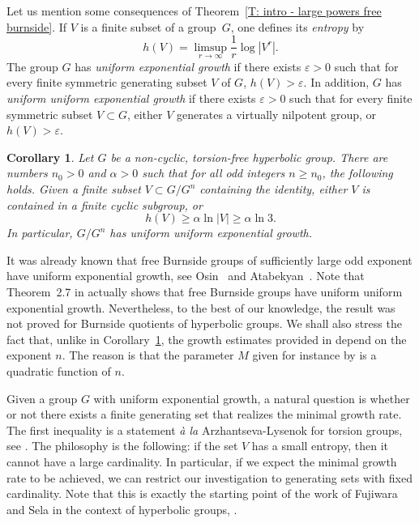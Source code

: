 \documentclass[11pt]{article}
\theoremstyle{plain}
\newtheorem{cor}[thm]{Corollary}
\theoremstyle{definition}
\begin{document}
Let us mention some consequences of Theorem~\ref{T: intro - large powers free burnside}.
If $V$ is a finite subset of a group~$G$, one defines its \emph{entropy} by
\begin{equation*}
h(V)= \limsup_{r \to \infty} \frac{1}{r}\log |V^r|.
\end{equation*}
The group $G$ has \emph{uniform exponential growth} if there exists $\varepsilon > 0$ such that for every finite symmetric generating subset $V$ of $G$, $h(V) > \varepsilon$.
In addition, $G$ has \emph{uniform uniform exponential growth} if there exists $\varepsilon > 0$ such that for every finite symmetric subset $V \subset G$, either $V$ generates a virtually nilpotent group, or $h(V) > \varepsilon$.

\begin{cor}
\label{C: intro - large powers free burnside}
Let $G$ be a non-cyclic, torsion-free hyperbolic group.
There are numbers $n_0>0$ and $\alpha>0$ such that for all odd integers $n \geqslant n_0$, the following holds.
Given a finite subset $V \subset G/G^n$ containing the identity, either $V$ is contained in a finite cyclic subgroup, or
\[
h(V) \geq \alpha \ln |V| \geq \alpha \ln 3.
\]
In particular, $G/G^n$ has uniform uniform exponential growth.
\end{cor}

It was already known that free Burnside groups of sufficiently large odd exponent have uniform exponential growth, see Osin~\cite[Cor.\,1.4]{osin_uniform_2007} and Atabekyan~\cite[Cor.\,3]{atabekyan_uniform_2009}.
Note that Theorem~2.7 in \cite{osin_uniform_2007} actually shows that free Burnside groups have uniform uniform exponential growth.
Nevertheless, to the best of our knowledge, the result was not proved for Burnside quotients of hyperbolic groups.
We shall also stress the fact that, unlike in Corollary~\ref{C: intro - large powers free burnside}, the growth estimates provided in \cite{osin_uniform_2007, atabekyan_uniform_2009} depend on the exponent $n$.
The reason is that the parameter $M$ given for instance by \cite[Th.\,2.7]{osin_uniform_2007} is a quadratic function of $n$.

Given a group $G$ with uniform exponential growth, a natural question is whether or not there exists a finite generating set that realizes the minimal growth rate.
The first inequality is a statement \emph{à la} Arzhantseva-Lysenok for torsion groups, see \cite[Th.\,1]{arzhantseva_lower_2006}.
The philosophy is the following: if the set $V$ has a small entropy, then it cannot have a large cardinality.
In particular, if we expect the minimal growth rate to be achieved, we can restrict our investigation to generating sets with fixed cardinality.
Note that this is exactly the starting point of the work of Fujiwara and Sela in the context of hyperbolic groups, \cite{fujiwara_rates_2020}.
\end{document}
